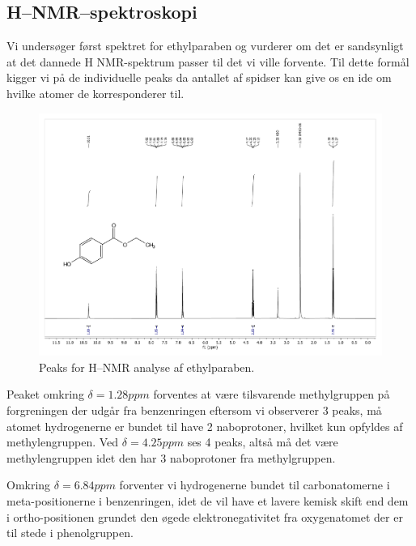     \subsection{H--NMR--spektroskopi}
    Vi undersøger først spektret for ethylparaben og vurderer om det er sandsynligt at det dannede H NMR-spektrum passer til det vi ville forvente. Til dette formål kigger vi på de individuelle peaks da antallet af spidser kan give os en ide om hvilke atomer de korresponderer til.
    \begin{figure}[H] \centering
        \includegraphics[width=\textwidth,page=2]{bilag/ethylnmr}
        \caption{Peaks for H--NMR analyse af ethylparaben.}
    \end{figure} 
    Peaket omkring $\delta=1.28\si{ppm}$ forventes at være tilsvarende methylgruppen på forgreningen der udgår fra benzenringen eftersom vi observerer 3 peaks, må atomet hydrogenerne er bundet til have 2 naboprotoner, hvilket kun opfyldes af methylengruppen. Ved $\delta=4.25\si{ppm}$ ses 4 peaks, altså må det være methylengruppen idet den har 3 naboprotoner fra methylgruppen. 
    
    Omkring $\delta=6.84\si{ppm}$ forventer vi hydrogenerne bundet til carbonatomerne i meta-positionerne i benzenringen, idet de vil have et lavere kemisk skift end dem i ortho-positionen grundet den øgede elektronegativitet fra oxygenatomet der er til stede i phenolgruppen.

